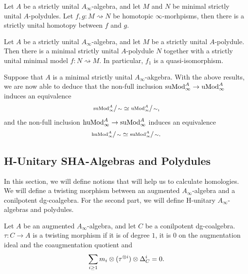 \documentclass[../thesis.tex]{subfiles}
\begin{document}
            \begin{thm}
                Let $A$ be a strictly unital $A_\infty$-algebra, and let $M$ and $N$ be minimal strictly unital $A$-polydules. Let $f, g: M \rightsquigarrow N$ be homotopic $\infty$-morhpisms, then there is a strictly unital homotopy between $f$ and $g$.
            \end{thm}

            \begin{proposition}
                Let $A$ be a strictly unital $A_\infty$-algebra, and let $M$ be a strictly unital $A$-polydule. Then there is a minimal strictly unital $A$-polydule $N$ together with a strictly unital minimal model $f: N \rightsquigarrow M$. In particular, $f_1$ is a quasi-isomorphism.
            \end{proposition}

            Suppose that $A$ is a minimal strictly unital $A_\infty$-akgebra. With the above results, we are now able to deduce that the non-full inclusion $\tt{suMod}_\infty^A \rightarrow \tt{uMod}_\infty^A$ induces an equivalence
            \begin{align*}
                \sfrac{\tt{suMod}_\infty^A}{\sim} \simeq \sfrac{\tt{uMod}_\infty^A}{\sim}\tt{,}
            \end{align*}
            and the non-full inclusion $\tt{huMod}_\infty^A \rightarrow \tt{suMod}_\infty^A$ induces an equivalence
            \begin{align*}
                \sfrac{\tt{huMod}_\infty^A}{\sim} \simeq \sfrac{\tt{suMod}_\infty^A}{\sim}\tt{.}
            \end{align*}

        \subsection{H-Unitary SHA-Algebras and Polydules}

            In this section, we will define notions that will help us to calculate homologies. We will define a twisting morphism between an augmented $A_\infty$-algebra and a conilpotent dg-coalgebra. For the second part, we will define H-unitary $A_\infty$-algebras and polydules.

            \begin{definition}
                Let $A$ be an augmented $A_\infty$-algebra, and let $C$ be a conilpotent dg-coalgebra. $\tau : C \rightarrow A$ is a twisting morphism if it is of degree $1$, it is $0$ on the augmentation ideal and the coaugmentation quotient and
                \begin{align*}
                    \sum_{i \geq 1} m_i \otimes (\tau^{\otimes i}) \otimes \Delta_C^i = 0\tt{.}
                \end{align*}
            \end{definition}
\end{document}
